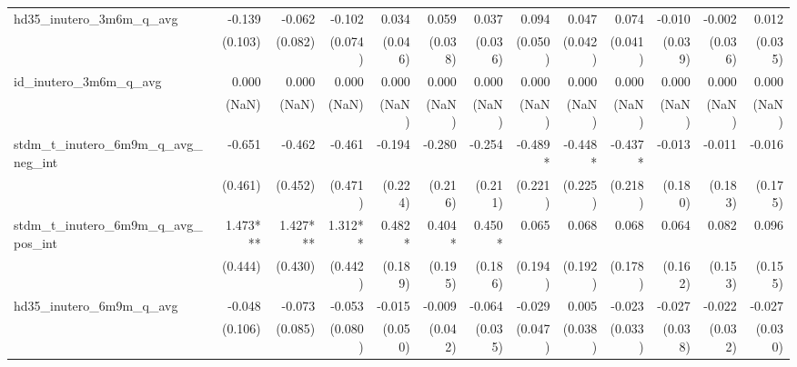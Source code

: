 \begin{tabular}{lrrrrrrrrrrrr}
hd35\_inutero\_3m6m\_q\_avg                 &       -0.139 &       -0.062 &       -0.102 &        0.034 &        0.059 &        0.037 &        0.094 &        0.047 &        0.074 &       -0.010 &       -0.002 &        0.012 \\ 
                                            &      (0.103) &      (0.082) &      (0.074) &      (0.046) &      (0.038) &      (0.036) &      (0.050) &      (0.042) &      (0.041) &      (0.039) &      (0.036) &      (0.035) \\ 
id\_inutero\_3m6m\_q\_avg                   &        0.000 &        0.000 &        0.000 &        0.000 &        0.000 &        0.000 &        0.000 &        0.000 &        0.000 &        0.000 &        0.000 &        0.000 \\ 
                                            &        (NaN) &        (NaN) &        (NaN) &        (NaN) &        (NaN) &        (NaN) &        (NaN) &        (NaN) &        (NaN) &        (NaN) &        (NaN) &        (NaN) \\ 
stdm\_t\_inutero\_6m9m\_q\_avg\_neg\_int    &       -0.651 &       -0.462 &       -0.461 &       -0.194 &       -0.280 &       -0.254 &      -0.489* &      -0.448* &      -0.437* &       -0.013 &       -0.011 &       -0.016 \\ 
                                            &      (0.461) &      (0.452) &      (0.471) &      (0.224) &      (0.216) &      (0.211) &      (0.221) &      (0.225) &      (0.218) &      (0.180) &      (0.183) &      (0.175) \\ 
stdm\_t\_inutero\_6m9m\_q\_avg\_pos\_int    &     1.473*** &     1.427*** &      1.312** &       0.482* &       0.404* &       0.450* &        0.065 &        0.068 &        0.068 &        0.064 &        0.082 &        0.096 \\ 
                                            &      (0.444) &      (0.430) &      (0.442) &      (0.189) &      (0.195) &      (0.186) &      (0.194) &      (0.192) &      (0.178) &      (0.162) &      (0.153) &      (0.155) \\ 
hd35\_inutero\_6m9m\_q\_avg                 &       -0.048 &       -0.073 &       -0.053 &       -0.015 &       -0.009 &       -0.064 &       -0.029 &        0.005 &       -0.023 &       -0.027 &       -0.022 &       -0.027 \\ 
                                            &      (0.106) &      (0.085) &      (0.080) &      (0.050) &      (0.042) &      (0.035) &      (0.047) &      (0.038) &      (0.033) &      (0.038) &      (0.032) &      (0.030) \\ 

\end{tabular}
